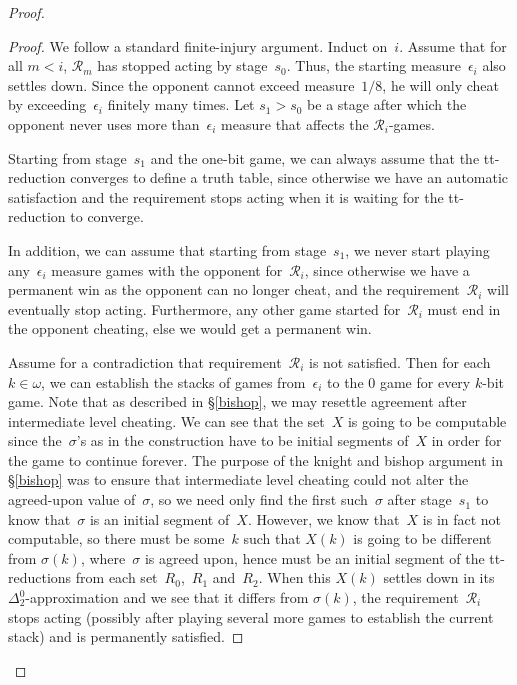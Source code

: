 \documentclass{LMCS}
\newcommand{\0}{\mathbf{0}}
\newcommand{\<}{\langle}
\renewcommand{\>}{\rangle}
\begin{document}
\begin{proof}
\begin{proof}
We follow a standard finite-injury argument. Induct on~$i$. Assume that for
all $m<i$, $\mathcal{R}_m$ has stopped acting by stage~$s_0$. Thus, the
starting measure~$\epsilon_i$ also settles down. Since the opponent cannot
exceed measure~$1/8$, he will only cheat by exceeding~$\epsilon_i$ finitely
many times. Let $s_1>s_0$ be a stage after which the opponent never uses more
than~$\epsilon_i$ measure that affects the $\mathcal{R}_i$-games.

Starting from stage~$s_1$ and the one-bit game, we can always assume that the
tt-reduction converges to define a truth table, since otherwise we have an
automatic satisfaction and the requirement stops acting when it is waiting
for the tt-reduction to converge.

In addition, we can assume that starting from stage~$s_1$, we never start
playing any~$\epsilon_i$ measure games with the opponent for~$\mathcal{R}_i$,
since otherwise we have a permanent win as the opponent can no longer cheat,
and the requirement~$\mathcal{R}_i$ will eventually stop acting. Furthermore,
any other game started for~$\mathcal{R}_i$ must end in the opponent cheating,
else we would get a permanent win.

Assume for a contradiction that requirement~$\mathcal{R}_i$ is not satisfied.
Then for each $k\in\omega$, we can establish the stacks of games
from~$\epsilon_i$ to the $0$ game for every $k$-bit game.  Note that as
described in \S\ref{bishop}, we may resettle agreement after intermediate
level cheating.  We can see that the set~$X$ is going to be computable since
the~$\sigma$'s as in the construction have to be initial segments of~$X$ in
order for the game to continue forever.  The purpose of the knight and bishop
argument in \S\ref{bishop} was to ensure that intermediate level cheating
could not alter the agreed-upon value of~$\sigma$, so we need only find the
first such~$\sigma$ after stage~$s_1$ to know that~$\sigma$ is an initial
segment of~$X$.  However, we know that~$X$ is in fact not computable, so
there must be some~$k$ such that $X(k)$ is going to be different from
$\sigma(k)$, where~$\sigma$ is agreed upon, hence must be an initial segment
of the tt-reductions from each set~$R_0$,~$R_1$ and~$R_2$.  When this $X(k)$
settles down in its $\Delta^0_2$-approximation and we see that it differs
from $\sigma(k)$, the requirement~$\mathcal{R}_i$ stops acting (possibly
after playing several more games to establish the current stack) and is
permanently satisfied.


\end{proof}
\end{proof}
\end{document}
